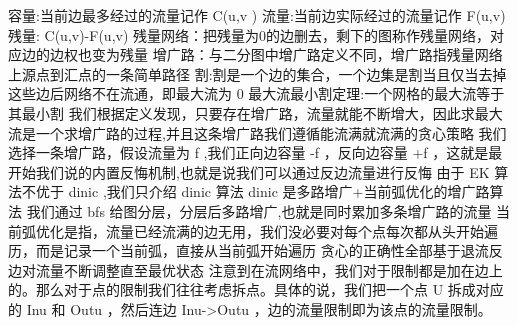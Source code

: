 {}容量:当前边最多经过的流量记作\markdownRendererDollarSign{} C(u,v\markdownRendererSoftLineBreak
{}) \markdownRendererDollarSign{}\markdownRendererParagraphSeparator
{}流量:当前边实际经过的流量记作\markdownRendererDollarSign{} F(u,v) \markdownRendererDollarSign{}\markdownRendererParagraphSeparator
{}残量:\markdownRendererDollarSign{} C(u,v)-F(u,v) \markdownRendererDollarSign{}\markdownRendererParagraphSeparator
{}残量网络：把残量为0的边删去，剩下的图称作残量网络，对应边的边权也变为残量\markdownRendererParagraphSeparator
{}增广路：与二分图中增广路定义不同，增广路指残量网络上源点到汇点的一条简单路径\markdownRendererParagraphSeparator
{}割:割是一个边的集合，一个边集是割当且仅当去掉这些边后网络不在流通，即最大流为\markdownRendererDollarSign{} 0 \markdownRendererDollarSign{}\markdownRendererParagraphSeparator
{}最大流最小割定理:一个网格的最大流等于其最小割\markdownRendererParagraphSeparator
{}我们根据定义发现，只要存在增广路，流量就能不断增大，因此求最大流是一个求增广路的过程,并且这条增广路我们遵循能流满就流满的贪心策略\markdownRendererParagraphSeparator
{}我们选择一条增广路，假设流量为\markdownRendererDollarSign{} f\markdownRendererSoftLineBreak
{}\markdownRendererDollarSign{},我们正向边容量\markdownRendererDollarSign{} -f \markdownRendererDollarSign{}，反向边容量\markdownRendererDollarSign{} +f\markdownRendererSoftLineBreak
{}\markdownRendererDollarSign{}，这就是最开始我们说的内置反悔机制,也就是说我们可以通过反边流量进行反悔\markdownRendererParagraphSeparator
{}由于\markdownRendererDollarSign{} EK \markdownRendererDollarSign{}算法不优于\markdownRendererDollarSign{} dinic \markdownRendererDollarSign{},我们只介绍\markdownRendererDollarSign{} dinic \markdownRendererDollarSign{}算法\markdownRendererParagraphSeparator
{}\markdownRendererDollarSign{} dinic \markdownRendererDollarSign{}是多路增广+当前弧优化的增广路算法\markdownRendererParagraphSeparator
{}我们通过\markdownRendererDollarSign{} bfs \markdownRendererDollarSign{}给图分层，分层后多路增广,也就是同时累加多条增广路的流量\markdownRendererParagraphSeparator
{}当前弧优化是指，流量已经流满的边无用，我们没必要对每个点每次都从头开始遍历，而是记录一个当前弧，直接从当前弧开始遍历\markdownRendererParagraphSeparator
{}贪心的正确性全部基于退流反边对流量不断调整直至最优状态\markdownRendererInterblockSeparator
{}\markdownRendererSectionBegin
{}\markdownRendererInterblockSeparator
{}注意到在流网络中，我们对于限制都是加在边上的。那么对于点的限制我们往往考虑拆点。具体的说，我们把一个点\markdownRendererDollarSign{} U\markdownRendererSoftLineBreak
{}\markdownRendererDollarSign{}拆成对应的\markdownRendererDollarSign{} Inu \markdownRendererDollarSign{}和\markdownRendererDollarSign{} Outu \markdownRendererDollarSign{}，然后连边\markdownRendererDollarSign{} Inu->Outu \markdownRendererDollarSign{}，边的流量限制即为该点的流量限制。\markdownRendererInterblockSeparator
